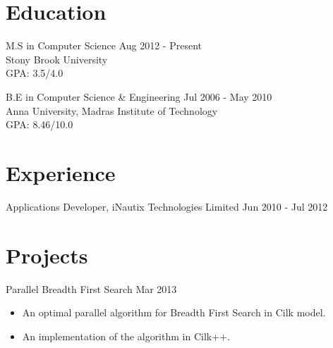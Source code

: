 \documentclass [margin] {res}
\begin{document}
 
 
 
\address{ 
rathakrishnanarun@gmail.com \\
https://github.com/r-arun  \\
        (631) 944-0302 
}
\address{Department of Computer Science \\ Stony Brook University \\ NY 11790 \\
         }

 
\begin{resume} 
 
\section{Education} 
M.S in Computer Science \hfill Aug 2012 - Present \\
Stony Brook University\\
GPA: 3.5/4.0 

B.E in Computer Science \& Engineering \hfill Jul 2006 - May 2010\\
Anna University, Madras Institute of Technology \\
GPA: 8.46/10.0
\section{Experience}
 Applications Developer, iNautix Technologies Limited \hfill Jun 2010 - Jul 2012
 
\section{Projects} 
		Parallel Breadth First Search \hfill   Mar 2013
                \begin{itemize} \itemsep -2pt
                 \item An optimal parallel algorithm for Breadth First Search in Cilk model.
                 \item An implementation of the algorithm in Cilk++.
		 \end{itemize}


\end{resume}
\end{document}

